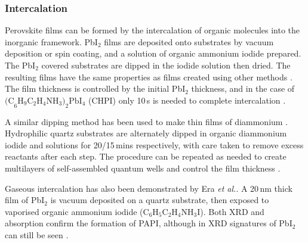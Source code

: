 \subsubsection{Intercalation}
Perovskite films can be formed by the intercalation of organic molecules into the inorganic framework. Pb$\textrm{I}_2$ films are deposited onto substrates by vacuum deposition or spin coating, and a solution of organic ammonium iodide prepared. The Pb$\textrm{I}_2$ covered substrates are dipped in the iodide solution then dried. The resulting films have the same properties as films created using other methods \cite{Liang1998}. The film thickness is controlled by the initial Pb$\textrm{I}_2$ thickness, and in the case of $\textrm{(C}_6\textrm{H}_9\textrm{C}_2\textrm{H}_4\textrm{NH}_3)_2\textrm{PbI}_4$ (CHPI) only 10\,s is needed to complete intercalation \cite{Pradeesh2009a}.

A similar dipping method has been used to make thin films of diammonium . Hydrophilic quartz substrates are alternately dipped in organic diammonium iodide and  solutions for 20/15\,mins respectively, with care taken to remove excess reactants after each step. The procedure can be repeated as needed to create multilayers of self-assembled quantum wells and control the film thickness \cite{Matsui2002}.

Gaseous intercalation has also been demonstrated by Era \textit{et al.}. A 20\,nm thick film of Pb$\textrm{I}_2$ is vacuum deposited on a quartz substrate, then exposed to vaporised organic ammonium iodide ($\textrm{C}_6\textrm{H}_5\textrm{C}_2\textrm{H}_4\textrm{NH}_3\textrm{I}$). Both XRD and absorption confirm the formation of PAPI, although in XRD signatures of Pb$\textrm{I}_2$ can still be seen \cite{Era1998}.

